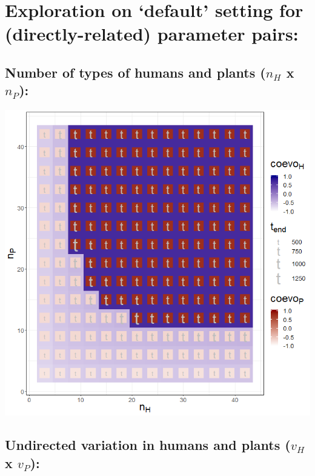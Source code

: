 \documentclass[]{book}
\begin{document}
\newpage

\hypertarget{exploration-on-default-setting-for-directly-related-parameter-pairs}{%
\section{Exploration on `default' setting for (directly-related) parameter pairs:}\label{exploration-on-default-setting-for-directly-related-parameter-pairs}}

\hypertarget{number-of-types-of-humans-and-plants-n_h-x-n_p}{%
\subsection{\texorpdfstring{Number of types of humans and plants (\(n_{H}\) x \(n_{P}\)):}{Number of types of humans and plants (n\_\{H\} x n\_\{P\}):}}\label{number-of-types-of-humans-and-plants-n_h-x-n_p}}

\includegraphics[width=1\linewidth]{plots/3_twoPar-n.H-n.P_plot}

\newpage

\hypertarget{undirected-variation-in-humans-and-plants-v_h-x-v_p}{%
\subsection{\texorpdfstring{Undirected variation in humans and plants (\(v_{H}\) x \(v_{P}\)):}{Undirected variation in humans and plants (v\_\{H\} x v\_\{P\}):}}\label{undirected-variation-in-humans-and-plants-v_h-x-v_p}}
\end{document}
